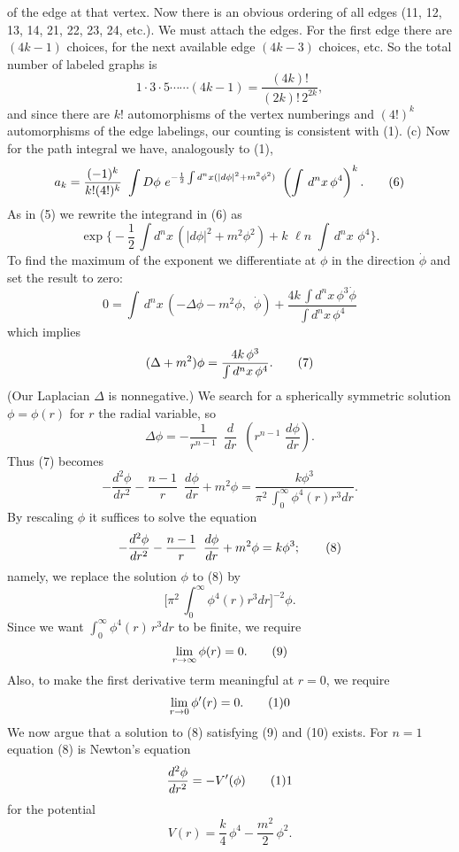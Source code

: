 of the edge at that vertex.  Now there is an obvious
ordering of all edges (11, 12, 13, 14, 21, 22, 23, 24,
etc.).  We must attach the edges.  For the first edge there
are $(4k-1)$ choices, for the next available edge $(4k-3)$
choices, etc.  So the total number of labeled graphs is
$$
1\cdot3\cdot5\cdots\cdots(4k-1)=\frac{(4k)!}{(2k)!\,2^{2k}},
$$
and since there are $k!$ automorphisms of the vertex
numberings and $(4!)^k$ automorphisms of the edge labelings, our
counting is consistent with (1).
\medskip
(c)   Now for the path integral we have, analogously to
(1), 
$$
a_k=\frac{(-1)^k}{k!(4!)^k}\,\,\int
D\phi\,\,e^{-\frac{1}{2}\int d^nx(|d\phi|^2+m^2\phi^2)}\,\,
\left(\int\,d^nx\,\phi^4\right)^k.\tag6
$$
\medskip
As in (5) we rewrite the integrand in (6) as
$$
\exp\biggl\{-\frac{1}{2}\,\int d^nx\,(|d\phi|^2+m^2\phi^2)+
k\,\,\ell n\,\,\int\,d^nx\,\,\phi^4\biggr\}.
$$
To find the maximum of the exponent we differentiate
at
$\phi$ in the direction $\dot\phi$ and set the result to
zero:
$$
0=\int\,d^nx\,(-\Delta\phi-m^2\phi,\,\,\,\dot\phi)+\frac{4k\,
\int d^nx\,\phi^3\dot\phi}{\int d^nx\,\phi^4}
$$
which implies
$$
(\Delta+m^2)\phi=\frac{4k\,\phi^3}{\int d^nx\,\phi^4}.\tag7
$$
(Our Laplacian $\Delta$ is nonnegative.)
\medskip
We search for a spherically symmetric solution
$\phi=\phi(r)$ for $r$ the radial variable, so
$$
\Delta\phi=-\frac{1}{r^{n-1}}\,\,\,\frac{d}{dr}\,\,\,\left(r
^{n-1}\,\,\frac{d\phi}{dr}\right).
$$
Thus (7) becomes
$$
-\frac{d^2\phi}{dr^2}-\frac{n-1}{r}\,\,\,
\frac{d\phi}{dr}+m^2\phi
=\frac{k\phi^3}{\pi^2\,\int\nolimits^\infty_0\phi^4(r)r^3dr}.
$$
By rescaling $\phi$ it suffices to solve the equation
$$
-\frac{d^2\phi}{dr^2}-\frac{n-1}{r}\,\,\,\frac{d\phi}{dr}+m^2
\phi=k\phi^3;\tag8
$$
namely, we replace the solution $\phi$ to (8) by
$$
\bigg[\pi^2\,\int\nolimits^\infty_0\phi^4(r)r^3dr\bigg]
^{-2}\phi.
$$
Since we want $\int\nolimits^\infty_0\phi^4(r)\,r^3dr$ to
be finite, we require
$$
\mathop{\lim}\limits_{r\rightarrow\infty}\phi(r)=0.\tag9
$$
Also, to make the first derivative term meaningful at
$r=0$, we require
$$
\mathop{\lim}\limits_{r\rightarrow0}\phi'(r)=0.\tag10
$$
We now argue that a solution to (8) satisfying (9) and (10)
exists.
\medskip
For $n=1$ equation (8) is Newton's equation
$$
\frac{d^2\phi}{dr^2}=-V'(\phi)\tag11
$$
for the potential
$$
V(r)=\frac{k}{4}\,\phi^4-\frac{m^2}{2}\,\phi^2.
$$
%
% 
%
